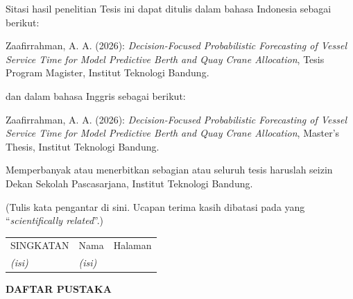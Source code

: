 \documentclass[twoside]{itb-tmi}
\begin{document}
Sitasi hasil penelitian Tesis ini dapat ditulis dalam bahasa Indonesia sebagai berikut:

{\singlespacing \hangindent=1.27cm\noindent Zaafirrahman, A. A. (2026): \textit{Decision-Focused Probabilistic Forecasting of Vessel Service Time for Model Predictive Berth and Quay Crane Allocation}, Tesis Program Magister, Institut Teknologi Bandung.}

dan dalam bahasa Inggris sebagai berikut:

{\singlespacing \hangindent=1.27cm\noindent Zaafirrahman, A. A. (2026): \textit{Decision-Focused Probabilistic Forecasting of Vessel Service Time for Model Predictive Berth and Quay Crane Allocation}, Master’s Thesis, Institut Teknologi Bandung.}

Memperbanyak atau menerbitkan sebagian atau seluruh tesis haruslah seizin Dekan Sekolah Pascasarjana, Institut Teknologi Bandung.

(Tulis kata pengantar di sini. Ucapan terima kasih dibatasi pada yang \textquotedblleft\textit{scientifically related}\textquotedblright{}.)
\daftarisi
\daftarlampiran
\daftargambar
\daftartabel
{}
\begin{singlespace}\noindent\begin{tabular}{@{}p{3.5cm}p{7.5cm}c@{}}SINGKATAN & Nama & Halaman\\[4pt]
\textit{(isi)} & \textit{(isi)} & \\ \end{tabular}\end{singlespace}
\clearpage{}





\clearpage{}
\begin{center}\bfseries\fontsize{14}{17}\selectfont DAFTAR PUSTAKA\end{center}
{\singlespacing\printbibliography[heading=none]}
\mulailampiran
{}
\end{document}

